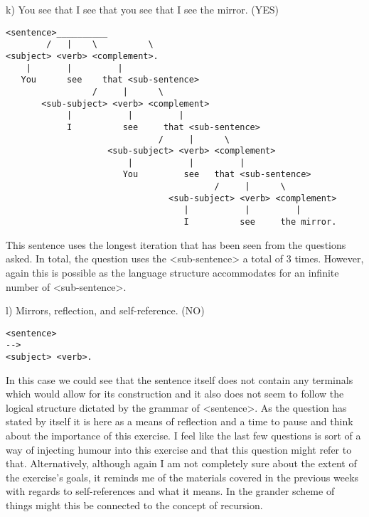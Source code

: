 \documentclass{article}
\begin{document}
\begin{alphabetize}
\item k)	You see that I see that you see that I see the mirror. (YES) \linebreak
\begin{lstlisting}
<sentence>__________
        /   |    \          \
<subject> <verb> <complement>.
    |       |         |
   You      see    that <sub-sentence>
                 /     |      \
       <sub-subject> <verb> <complement>
            |           |         |
            I          see     that <sub-sentence>
                              /     |      \
                    <sub-subject> <verb> <complement>
                        |           |         |
                       You         see   that <sub-sentence>
                                         /     |      \
                                <sub-subject> <verb> <complement>
                                   |           |         |
                                   I          see     the mirror.
\end{lstlisting} \linebreak
This sentence uses the longest iteration that has been seen from the questions asked. In total, the question uses the <sub-sentence> a total of 3 times. However, again this is possible as the language structure accommodates for an infinite number of <sub-sentence>. \linebreak
\item l)	Mirrors, reflection, and self-reference. (NO) 
\begin{lstlisting}
<sentence> 
-->  
<subject> <verb>.
\end{lstlisting} \linebreak
In this case we could see that the sentence itself does not contain any terminals which would allow for its construction and it also does not seem to follow the logical structure dictated by the grammar of <sentence>. \linebreak \linebreak
As the question has stated by itself it is here as a means of reflection and a time to pause and think about the importance of this exercise. I feel like the last few questions is sort of a way of injecting humour into this exercise and that this question might refer to that. Alternatively, although again I am not completely sure about the extent of the exercise’s goals, it reminds me of the materials covered in the previous weeks with regards to self-references and what it means. In the grander scheme of things might this be connected to the concept of recursion.  
\end{alphabetize}
\end{document}
